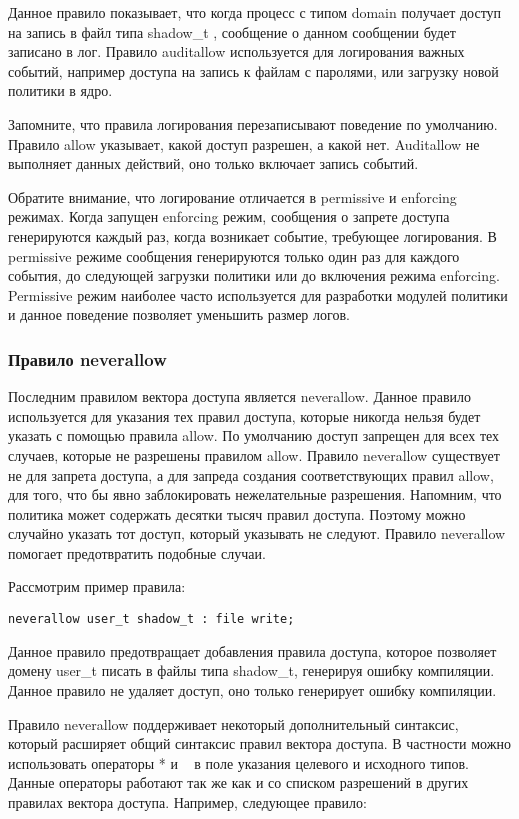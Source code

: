 \documentclass{./../class/UIR}
\begin{document}
Данное правило показывает, что когда процесс с типом domain получает доступ на
запись в файл типа shadow\_t , сообщение о данном сообщении будет записано в
лог. Правило auditallow используется для логирования важных событий, например
доступа на запись к файлам с паролями, или загрузку новой политики в ядро.

Запомните, что правила логирования перезаписывают поведение по умолчанию.
Правило allow указывает, какой доступ разрешен, а какой нет. Auditallow не
выполняет данных действий, оно только включает запись событий.

Обратите внимание, что логирование отличается в permissive и enforcing режимах.
Когда запущен enforcing режим, сообщения о запрете доступа генерируются каждый
раз, когда возникает событие, требующее логирования. В permissive режиме
сообщения генерируются только один раз для каждого события, до следующей
загрузки политики или до включения режима enforcing. Permissive режим наиболее
часто используется для разработки модулей политики и данное поведение позволяет
уменьшить размер логов.

\subsubsection{Правило neverallow}

Последним правилом вектора доступа является neverallow. Данное правило
используется для указания тех правил доступа, которые никогда нельзя будет
указать с помощью правила allow. По умолчанию доступ запрещен для всех тех
случаев, которые не разрешены правилом allow. Правило neverallow существует не
для запрета доступа, а для запреда создания соответствующих правил allow, для
того, что бы явно заблокировать нежелательные разрешения. Напомним, что политика
может содержать десятки тысяч правил доступа. Поэтому можно случайно указать тот
доступ, который указывать не следуют. Правило neverallow помогает предотвратить
подобные случаи.

Рассмотрим пример правила:

\begin{verbatim}
neverallow user_t shadow_t : file write;
\end{verbatim}

Данное правило предотвращает добавления правила доступа, которое позволяет
домену user\_t писать в файлы типа shadow\_t, генерируя ошибку компиляции.
Данное правило не удаляет доступ, оно только генерирует ошибку компиляции.

Правило neverallow поддерживает некоторый дополнительный синтаксис, который
расширяет общий синтаксис правил вектора доступа. В частности можно использовать
операторы * и ~ в поле указания целевого и исходного типов. Данные операторы
работают так же как и со списком разрешений в других правилах вектора доступа.
Например, следующее правило:
\end{document}
